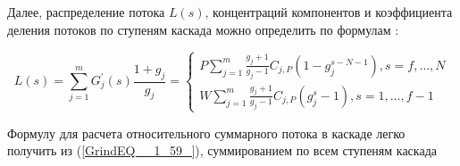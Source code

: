 Далее, распределение потока $L(s)$, концентраций компонентов и коэффициента деления потоков по ступеням каскада можно определить по формулам \cite{sulaberidzeTeoriyaKaskadovDlya2011}:

\begin{equation} \label{GrindEQ__1_59_} 
  L(s)=\sum_{j=1}^{m} G_{j}^{\prime}(s) \frac{1+g_{j}}{g_{j}}=\left\{\begin{array}{c}
  P \sum_{j=1}^{m} \frac{g_{j}+1}{g_{j}-1} C_{j,P}\left(1-g_{j}^{s-N-1}\right), s=f, \ldots, N \\
  W \sum_{j=1}^{m} \frac{g_{j}+1}{g_{j}-1} C_{j,P}\left(g_{j}^{s}-1\right), s=1, \ldots, f-1
  \end{array}\right.
\end{equation} 



Формулу для расчета относительного суммарного потока в каскаде легко получить из (\ref{GrindEQ__1_59_}), суммированием по всем ступеням каскада

